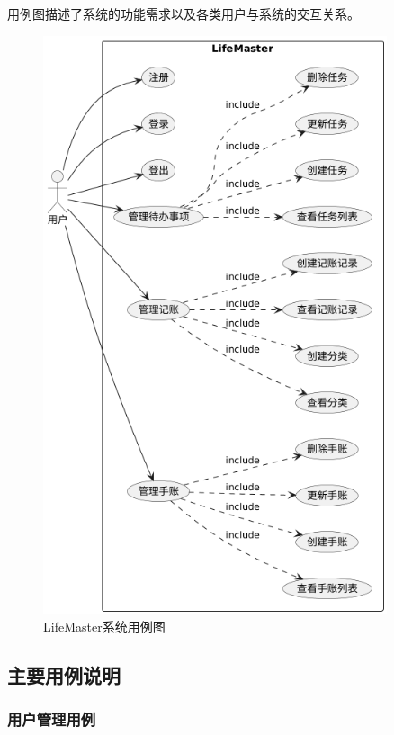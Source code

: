 \documentclass[a4paper]{article}
\begin{document}
用例图描述了系统的功能需求以及各类用户与系统的交互关系。

\begin{figure}[H]
\centering
\includegraphics[width=0.9\textwidth]{img/use_case_diagram.png}
\caption{LifeMaster系统用例图}
\end{figure}

\subsection{主要用例说明}

\subsubsection{用户管理用例}
\end{document}
